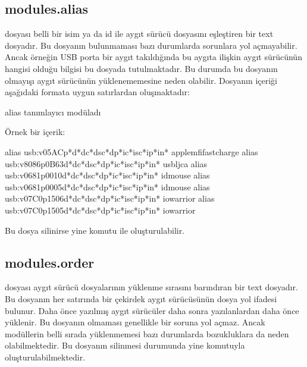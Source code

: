 \documentclass[a4paper,10pt,turkish]{sphinxmanual}
\begin{document}
\subsection{modules.alias}
\label{\detokenize{kernelcompilation:modules-alias}}
\sphinxAtStartPar
{} dosyası belli bir isim ya da id ile aygıt sürücü dosyasını eşleştiren bir text
dosyadır. Bu dosyanın bulunmaması bazı durumlarda sorunlara yol açmayabilir. Ancak örneğin USB porta
bir aygıt takıldığında bu aygıta ilişkin aygıt sürücünün hangisi olduğu bilgisi bu dosyada
tutulmaktadır. Bu durumda bu dosyanın olmayışı aygıt sürücünün yüklenememesine neden olabilir.
Dosyanın içeriği aşağıdaki formata uygun satırlardan oluşmaktadır:

\begin{sphinxVerbatim}[commandchars=\\\{\}]
alias \PYGZlt{}tanımlayıcı\PYGZgt{} \PYGZlt{}modül\PYGZus{}adı\PYGZgt{}
\end{sphinxVerbatim}

\sphinxAtStartPar
Örnek bir içerik:

\begin{sphinxVerbatim}[commandchars=\\\{\}]
alias usb:v05ACp*d*dc*dsc*dp*ic*isc*ip*in* apple\PYGZus{}mfi\PYGZus{}fastcharge
alias usb:v8086p0B63d*dc*dsc*dp*ic*isc*ip*in* usb\PYGZus{}ljca
alias usb:v0681p0010d*dc*dsc*dp*ic*isc*ip*in* idmouse
alias usb:v0681p0005d*dc*dsc*dp*ic*isc*ip*in* idmouse
alias usb:v07C0p1506d*dc*dsc*dp*ic*isc*ip*in* iowarrior
alias usb:v07C0p1505d*dc*dsc*dp*ic*isc*ip*in* iowarrior
\end{sphinxVerbatim}

\sphinxAtStartPar
Bu dosya silinirse yine  komutu ile oluşturulabilir.


\subsection{modules.order}
\label{\detokenize{kernelcompilation:modules-order}}
\sphinxAtStartPar
{} dosyası aygıt sürücü dosyalarının yüklenme sırasını barındıran bir text dosyadır.
Bu dosyanın her satırında bir çekirdek aygıt sürücüsünün dosya yol ifadesi bulunur. Daha önce
yazılmış aygıt sürücüler daha sonra yazılanlardan daha önce yüklenir. Bu dosyanın olmaması genellikle
bir soruna yol açmaz. Ancak modüllerin belli sırada yüklenmemesi bazı durumlarda bozukluklara da
neden olabilmektedir. Bu dosyanın silinmesi durumunda yine  komutuyla oluşturulabilmektedir.
\end{document}
